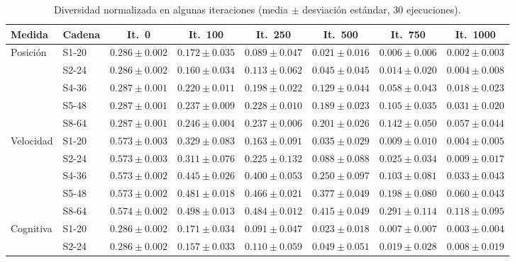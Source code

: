 \begin{table}[H]
\centering
\caption{Diversidad normalizada en algunas iteraciones (media $\pm$ desviación estándar, 30 ejecuciones).}
\label{tab:diversidad}
\small
\setlength{\tabcolsep}{3pt}
\begin{adjustbox}{max width=\textwidth}
\begin{tabular}{llcccccc}
\toprule
Medida & Cadena & It.~0 & It.~100 & It.~250 & It.~500 & It.~750 & It.~1000 \\
\midrule
\multirow{5}{*}{Posición}
 & S1-20 & $0.286 \pm 0.002$ & $0.172 \pm 0.035$ & $0.089 \pm 0.047$ & $0.021 \pm 0.016$ & $0.006 \pm 0.006$ & $0.002 \pm 0.003$ \\
 & S2-24 & $0.286 \pm 0.002$ & $0.160 \pm 0.034$ & $0.113 \pm 0.062$ & $0.045 \pm 0.045$ & $0.014 \pm 0.020$ & $0.004 \pm 0.008$ \\
 & S4-36 & $0.287 \pm 0.001$ & $0.220 \pm 0.011$ & $0.198 \pm 0.022$ & $0.129 \pm 0.044$ & $0.058 \pm 0.043$ & $0.018 \pm 0.023$ \\
 & S5-48 & $0.287 \pm 0.001$ & $0.237 \pm 0.009$ & $0.228 \pm 0.010$ & $0.189 \pm 0.023$ & $0.105 \pm 0.035$ & $0.031 \pm 0.020$ \\
 & S8-64 & $0.287 \pm 0.001$ & $0.246 \pm 0.004$ & $0.237 \pm 0.006$ & $0.201 \pm 0.026$ & $0.142 \pm 0.050$ & $0.057 \pm 0.044$ \\
\midrule
\multirow{5}{*}{Velocidad}
 & S1-20 & $0.573 \pm 0.003$ & $0.329 \pm 0.083$ & $0.163 \pm 0.091$ & $0.035 \pm 0.029$ & $0.009 \pm 0.010$ & $0.004 \pm 0.005$ \\
 & S2-24 & $0.573 \pm 0.003$ & $0.311 \pm 0.076$ & $0.225 \pm 0.132$ & $0.088 \pm 0.088$ & $0.025 \pm 0.034$ & $0.009 \pm 0.017$ \\
 & S4-36 & $0.573 \pm 0.002$ & $0.445 \pm 0.026$ & $0.400 \pm 0.053$ & $0.250 \pm 0.097$ & $0.103 \pm 0.081$ & $0.033 \pm 0.043$ \\
 & S5-48 & $0.573 \pm 0.002$ & $0.481 \pm 0.018$ & $0.466 \pm 0.021$ & $0.377 \pm 0.049$ & $0.198 \pm 0.080$ & $0.060 \pm 0.043$ \\
 & S8-64 & $0.574 \pm 0.002$ & $0.498 \pm 0.013$ & $0.484 \pm 0.012$ & $0.415 \pm 0.049$ & $0.291 \pm 0.114$ & $0.118 \pm 0.095$ \\
\midrule
\multirow{5}{*}{Cognitiva}
 & S1-20 & $0.286 \pm 0.002$ & $0.171 \pm 0.034$ & $0.091 \pm 0.047$ & $0.023 \pm 0.018$ & $0.007 \pm 0.007$ & $0.003 \pm 0.004$ \\
 & S2-24 & $0.286 \pm 0.002$ & $0.157 \pm 0.033$ & $0.110 \pm 0.059$ & $0.049 \pm 0.051$ & $0.019 \pm 0.028$ & $0.008 \pm 0.019$ \\

\end{tabular}
\end{adjustbox}
\end{table}
